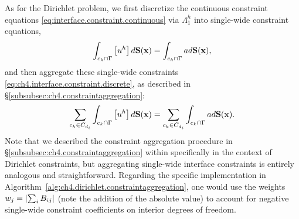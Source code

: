 As for the Dirichlet problem, we first discretize the continuous constraint equations \eqref{eq:interface.constraint.continuous} via $\Lambda^h_1$ into single-wide constraint equations,
\begin{equation} \label{eq:ch4.interface.constraint.discrete}
\int_{c_k \cap \Gamma} \left[ u^h \right] d\mathbf{S}(\mathbf{x}) = \int_{c_k \cap \Gamma} a d\mathbf{S}(\mathbf{x}),
\end{equation}
and then aggregate these single-wide constraints \eqref{eq:ch4.interface.constraint.discrete}, as described in \S\ref{subsubsec:ch4.constraintaggregation}:
\begin{equation} \label{eq:ch4.interface.aggregateconstraint}
\sum_{c_k \in C_{d_i}} \int_{c_k \cap \Gamma} \left[ u^h \right] d\mathbf{S}(\mathbf{x}) = \sum_{c_k \in C_{d_i}} \int_{c_k \cap \Gamma} a d\mathbf{S}(\mathbf{x}).
\end{equation}
Note that we described the constraint aggregation procedure in \S\ref{subsubsec:ch4.constraintaggregation} within specifically in the context of Dirichlet constraints, but aggregating single-wide interface constraints is entirely analogous and straightforward. Regarding the specific implementation in Algorithm~\ref{alg:ch4.dirichlet.constraintaggregation}, one would use the weights $w_j = \left\lvert \sum_i B_{ij} \right\rvert$ (note the addition of the absolute value) to account for negative single-wide constraint coefficients on interior degrees of freedom.

